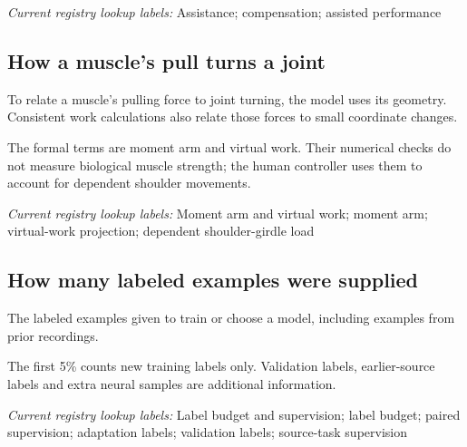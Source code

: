\noindent\textit{Current registry lookup labels:} Assistance; compensation; assisted performance\par

\begin{samepage}
\subsection*{How a muscle’s pull turns a joint}
\noindent To relate a muscle’s pulling force to joint turning, the model uses its geometry. Consistent work calculations also relate those forces to small coordinate changes.\par
\end{samepage}
\begin{samepage}
\noindent The formal terms are moment arm and virtual work. Their numerical checks do not measure biological muscle strength; the human controller uses them to account for dependent shoulder movements.\par\nopagebreak[4]

\end{samepage}


\noindent\textit{Current registry lookup labels:} Moment arm and virtual work; moment arm; virtual-work projection; dependent shoulder-girdle load\par

\begin{samepage}
\subsection*{How many labeled examples were supplied}
\noindent The labeled examples given to train or choose a model, including examples from prior recordings.\par
\end{samepage}
\begin{samepage}
\noindent The first 5\% counts new training labels only. Validation labels, earlier-source labels and extra neural samples are additional information.\par\nopagebreak[4]

\end{samepage}


\noindent\textit{Current registry lookup labels:} Label budget and supervision; label budget; paired supervision; adaptation labels; validation labels; source-task supervision\par

